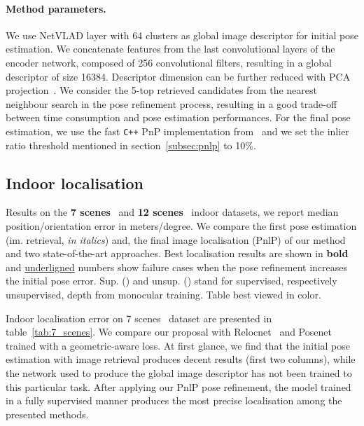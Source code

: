 \paragraph{Method parameters.} We use NetVLAD layer with 64 clusters as global image descriptor for initial pose estimation. We concatenate features from the last convolutional layers of the encoder network, composed of 256 convolutional filters, resulting in a global descriptor of size 16384. Descriptor dimension can be further reduced with PCA projection~\citep{Arandjelovic2017}. We consider the 5-top retrieved candidates from the nearest neighbour search in the pose refinement process, resulting in a good trade-off between time consumption and pose estimation performances. For the final pose estimation, we use the fast \texttt{C++} PnP implementation from~\citep{Kneip2014opengv} and we set the inlier ratio threshold mentioned in section~\ref{subsec:pnlp} to 10\%.

\subsection{Indoor localisation}
\label{subseq:indoor}

\begin{table}[t]
	\centering
	
	\vspace{5pt}
	\caption{\label{tab:7_scenes} Results on the \textbf{7 scenes}~\citep{Shotton2013} and \textbf{12 scenes}~\citep{Valentin2016} indoor datasets, we report median position/orientation error in meters/degree. We compare the first pose estimation (im. retrieval, \textit{in italics}) and, the final image localisation (PnlP) of our method and two state-of-the-art approaches. Best localisation results are shown in \textbf{bold} and \underline{underligned} numbers show failure cases when the pose refinement increases the initial pose error. Sup. () and unsup. () stand for supervised, respectively unsupervised, depth from monocular training. Table best viewed in color.}
\end{table}

Indoor localisation error on 7 scenes~\citep{Shotton2013} dataset are presented in table~\ref{tab:7_scenes}. We compare our proposal with Relocnet~\citep{Purkait2018} and Posenet~\citep{Kendall2017} trained with a geometric-aware loss. At first glance, we find that the initial pose estimation with image retrieval produces decent results (first two columns), while the network used to produce the global image descriptor has not been trained to this particular task. After applying our PnlP pose refinement, the model trained in a fully supervised manner produces the most precise localisation among the presented methods. 

